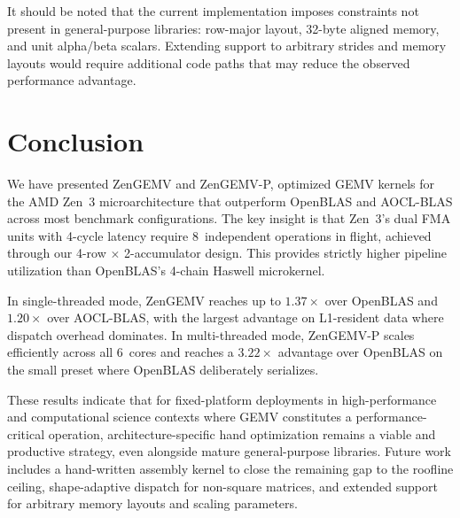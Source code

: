 \documentclass[runningheads]{llncs}
\begin{document}
It should be noted that the current implementation imposes constraints not present
in general-purpose libraries: row-major layout, 32-byte aligned memory, and unit
alpha/beta scalars. Extending support to arbitrary strides and memory layouts
would require additional code paths that may reduce the observed performance advantage.


\section{Conclusion}

We have presented ZenGEMV and ZenGEMV-P, optimized GEMV kernels for the AMD
Zen~3 microarchitecture that outperform OpenBLAS and AOCL-BLAS across most benchmark
configurations. The key insight is that Zen~3's dual FMA units with 4-cycle
latency require 8~independent operations in flight, achieved through our
4-row $\times$ 2-accumulator design. This provides strictly higher pipeline
utilization than OpenBLAS's 4-chain Haswell microkernel.

In single-threaded mode, ZenGEMV reaches up to $1.37\times$ over OpenBLAS and
$1.20\times$ over AOCL-BLAS, with the largest advantage on L1-resident data
where dispatch overhead dominates. In multi-threaded mode, ZenGEMV-P scales
efficiently across all 6~cores and reaches a $3.22\times$ advantage over
OpenBLAS on the small preset where OpenBLAS deliberately serializes.

These results indicate that for fixed-platform deployments in high-performance
and computational science contexts where GEMV constitutes a performance-critical
operation, architecture-specific hand optimization remains a viable and productive
strategy, even alongside mature general-purpose libraries. Future work includes a
hand-written assembly kernel to close the remaining gap to the roofline ceiling,
shape-adaptive dispatch for non-square matrices, and extended support for
arbitrary memory layouts and scaling parameters.
\end{document}
